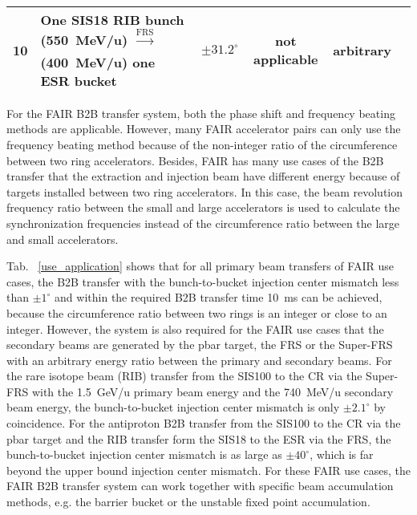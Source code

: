 \begin{table*}[!hbp]
\begin{center}
\begin{tabular}{| c | p{4cm}| p{2cm} | c | c |p{7cm} |}
10&One SIS18 RIB bunch (\SI{550}{MeV/u}) $\xrightarrow[\text{}]{\text{FRS}}$ (\SI{400}{MeV/u}) one ESR bucket &$\pm31.2^\circ$	& not applicable & arbitrary&		\\ \hline

    \end{tabular}
\end{center}
\end{table*}

For the FAIR B2B transfer system, both the phase shift and frequency beating methods are applicable. However, many FAIR accelerator pairs can only use the frequency beating method because of the non-integer ratio of the circumference between two ring accelerators. Besides, FAIR has many use cases of the B2B transfer that the extraction and injection beam have different energy because of targets installed between two ring accelerators. In this case, the beam revolution frequency ratio between the small and large accelerators is used to calculate the synchronization frequencies instead of the circumference ratio between the large and small accelerators. 

Tab. ~\ref{use_application} shows that for all primary beam transfers of FAIR use cases, the B2B transfer with the bunch-to-bucket injection center mismatch less than $\pm1^\circ$ and within the required B2B transfer time \SI{10}{\ms} can be achieved, because the circumference ratio between two rings is an integer or close to an integer. However, the system is also required for the FAIR use cases that the secondary beams are generated by the pbar target, the FRS or the Super-FRS with an arbitrary energy ratio between the primary and secondary beams. For the rare isotope beam (RIB) transfer from the SIS100 to the CR via the Super-FRS with the \SI{1.5}{GeV/u} primary beam energy and the \SI{740}{MeV/u} secondary beam energy, the bunch-to-bucket injection center mismatch is only $\pm2.1^\circ$ by coincidence. For the antiproton B2B transfer from the SIS100 to the CR via the pbar target and the RIB transfer form the SIS18 to the ESR via the FRS, the bunch-to-bucket injection center mismatch is as large as $\pm40^\circ$, which is far beyond the upper bound injection center mismatch. For these FAIR use cases, the FAIR B2B transfer system can work together with specific beam accumulation methods, e.g. the barrier bucket or the unstable fixed point accumulation.



